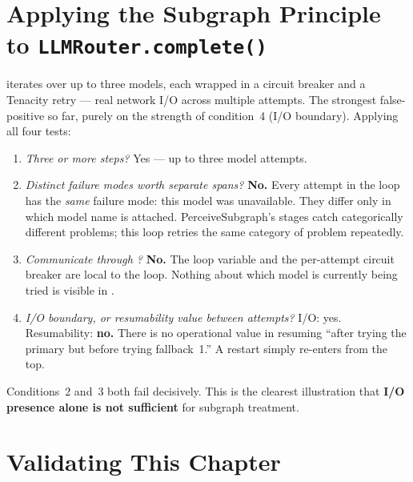 \section{Applying the Subgraph Principle to \texttt{LLMRouter.complete()}}
\label{sec:ch5-subgraph}

 iterates over up to three models, each wrapped in a
circuit breaker and a Tenacity retry --- real network I/O across multiple
attempts.  The strongest false-positive so far, purely on the strength of
condition~4 (I/O boundary).  Applying all four tests:

\begin{takeawaybox}
\begin{enumerate}
  \item \emph{Three or more steps?}  Yes --- up to three model attempts.
  \item \emph{Distinct failure modes worth separate spans?}
        \textbf{No.}  Every attempt in the loop has the \emph{same}
        failure mode: this model was unavailable.  They differ only in
        which model name is attached.  PerceiveSubgraph's stages catch
        categorically different problems; this loop retries the same
        category of problem repeatedly.
  \item \emph{Communicate through ?}  \textbf{No.}
        The loop variable  and the per-attempt circuit
        breaker are local to the  loop.  Nothing about which
        model is currently being tried is visible in .
  \item \emph{I/O boundary, or resumability value between attempts?}
        I/O: yes.  Resumability: \textbf{no.}  There is no operational
        value in resuming ``after trying the primary but before trying
        fallback~1.''  A restart simply re-enters  from
        the top.
\end{enumerate}
Conditions~2 and~3 both fail decisively.  This is the clearest
illustration that \textbf{I/O presence alone is not sufficient} for
subgraph treatment.
\end{takeawaybox}

\section{Validating This Chapter}
\label{sec:ch5-tests}

